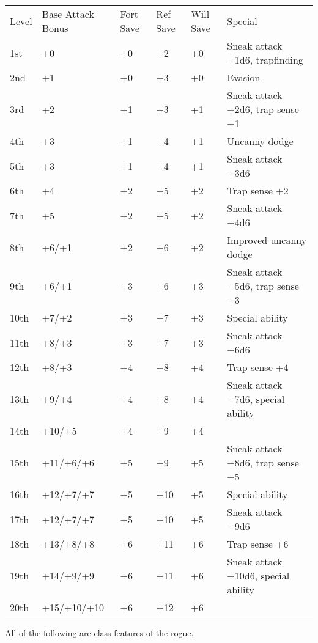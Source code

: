 \begin{table}[tbh]
\begin{small}
\begin{tabular}{lp{2cm}p{0.7cm}p{0.7cm}p{0.7cm}l}
Level  &Base Attack  Bonus &Fort Save &Ref Save &Will Save &Special\\
1st  &+0          &+0 &+2  &+0 & Sneak attack +1d6, trapfinding \\
2nd  &+1          &+0 &+3  &+0 & Evasion \\
3rd  &+2          &+1 &+3  &+1 & Sneak attack +2d6, trap sense +1 \\
4th  &+3          &+1 &+4  &+1 & Uncanny dodge \\
5th  &+3          &+1 &+4  &+1 & Sneak attack +3d6 \\
6th  &+4          &+2 &+5  &+2 & Trap sense +2 \\
7th  &+5          &+2 &+5  &+2 & Sneak attack +4d6 \\
8th  &+6/+1       &+2 &+6  &+2 & Improved uncanny dodge \\
9th  &+6/+1       &+3 &+6  &+3 & Sneak attack +5d6, trap sense +3 \\
10th &+7/+2       &+3 &+7  &+3 & Special ability \\
11th &+8/+3       &+3 &+7  &+3 & Sneak attack +6d6 \\
12th &+8/+3       &+4 &+8  &+4 & Trap sense +4 \\
13th &+9/+4       &+4 &+8  &+4 & Sneak attack +7d6, special ability \\
14th &+10/+5      &+4 &+9  &+4 & \\
15th &+11/+6/+6   &+5 &+9  &+5 & Sneak attack +8d6, trap sense +5 \\
16th &+12/+7/+7   &+5 &+10 &+5 & Special ability \\
17th &+12/+7/+7   &+5 &+10 &+5 & Sneak attack +9d6 \\
18th &+13/+8/+8   &+6 &+11 &+6 & Trap sense +6 \\
19th &+14/+9/+9   &+6 &+11 &+6 & Sneak attack +10d6, special ability \\
20th &+15/+10/+10 &+6 &+12 &+6 & \\
\end{tabular}
\end{small}
\end{table}

\smallskip\noindent All of the following are class features of the rogue.


